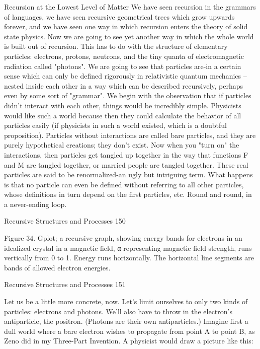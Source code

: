                     Recursion at the Lowest Level of Matter
        We have seen recursion in the grammars of languages, we have seen recursive
geometrical trees which grow upwards forever, and we have seen one way in which
recursion enters the theory of solid state physics. Now we are going to see yet another
way in which the whole world is built out of recursion. This has to do with the structure
of elementary particles: electrons, protons, neutrons, and the tiny quanta of
electromagnetic radiation called "photons". We are going to see that particles are-in a
certain sense which can only be defined rigorously in relativistic quantum mechanics --
nested inside each other in a way which can be described recursively, perhaps even by
some sort of "grammar".
        We begin with the observation that if particles didn't interact with each other,
things would be incredibly simple. Physicists would like such a world because then they
could calculate the behavior of all particles easily (if physicists in such a world existed,
which is a doubtful proposition). Particles without interactions are called bare particles,
and they are purely hypothetical creations; they don't exist.
        Now when you "turn on" the interactions, then particles get tangled up together in
the way that functions F and M are tangled together, or married people are tangled
together. These real particles are said to be renormalized-an ugly but intriguing term.
What happens is that no particle can even be defined without referring to all other
particles, whose definitions in turn depend on the first particles, etc. Round and round, in
a never-ending loop.




Recursive Structures and Processes                                                      150

Figure 34. Gplot; a recursive graph, showing energy bands for electrons in an idealized
crystal in a magnetic field, α representing magnetic field strength, runs vertically from 0
to 1. Energy runs horizontally. The horizontal line segments are bands of allowed
electron energies.


Recursive Structures and Processes                                                     151

        Let us be a little more concrete, now. Let's limit ourselves to only two kinds of
particles: electrons and photons. We'll also have to throw in the electron's antiparticle, the
positron. (Photons are their own antiparticles.) Imagine first a dull world where a bare
electron wishes to propagate from point A to point B, as Zeno did in my Three-Part
Invention. A physicist would draw a picture like this:




